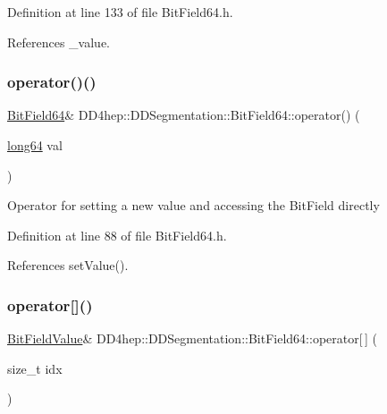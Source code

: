 Definition at line 133 of file Bit\+Field64.\+h.



References \+\_\+value.

\hypertarget{class_d_d4hep_1_1_d_d_segmentation_1_1_bit_field64_af77a45d60bd3947bbfcd7822b06cbc9f}{}\label{class_d_d4hep_1_1_d_d_segmentation_1_1_bit_field64_af77a45d60bd3947bbfcd7822b06cbc9f} 
\subsubsection{\texorpdfstring{operator()()}{operator()()}}
{\footnotesize\ttfamily \hyperlink{class_d_d4hep_1_1_d_d_segmentation_1_1_bit_field64}{Bit\+Field64}\& D\+D4hep\+::\+D\+D\+Segmentation\+::\+Bit\+Field64\+::operator() (\begin{DoxyParamCaption}\item[{\hyperlink{namespace_d_d4hep_ac2a70e722b33dc7ddaa20db8954ac836}{long64}}]{val }\end{DoxyParamCaption})\hspace{0.3cm}{\ttfamily [inline]}}

Operator for setting a new value and accessing the Bit\+Field directly 

Definition at line 88 of file Bit\+Field64.\+h.



References set\+Value().

\hypertarget{class_d_d4hep_1_1_d_d_segmentation_1_1_bit_field64_aa04125e96306ce31f9aa042c4123c315}{}\label{class_d_d4hep_1_1_d_d_segmentation_1_1_bit_field64_aa04125e96306ce31f9aa042c4123c315} 
\subsubsection{\texorpdfstring{operator[]()}{operator[]()}\hspace{0.1cm}{\footnotesize\ttfamily [1/4]}}
{\footnotesize\ttfamily \hyperlink{class_d_d4hep_1_1_d_d_segmentation_1_1_bit_field_value}{Bit\+Field\+Value}\& D\+D4hep\+::\+D\+D\+Segmentation\+::\+Bit\+Field64\+::operator\mbox{[}$\,$\mbox{]} (\begin{DoxyParamCaption}\item[{size\+\_\+t}]{idx }\end{DoxyParamCaption})\hspace{0.3cm}{\ttfamily [inline]}}

